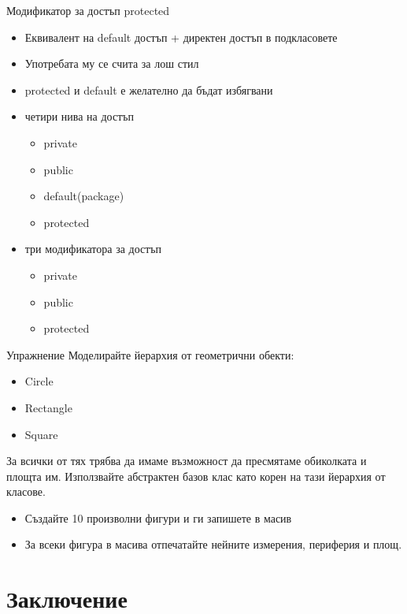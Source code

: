 \documentclass{beamer}
\begin{document}
\begin{frame}{Модификатор за достъп protected}
  \transdissolve
  \begin{itemize}
  \item Еквивалент на default достъп + директен достъп в подкласовете \pause
  \item Употребата му се счита за лош стил \pause
  \item protected и default е желателно да бъдат избягвани \pause
  \item четири нива на достъп
    \begin{itemize}
      \item private
      \item public
      \item default(package)
      \item protected
    \end{itemize}
  \item три модификатора за достъп \pause
    \begin{itemize}
      \item private
      \item public
      \item protected
    \end{itemize}
  \end{itemize}
\end{frame}

\begin{frame}{Упражнение}
  \transdissolve
  Моделирайте йерархия от геометрични обекти:
  \begin{itemize}
    \item Circle
    \item Rectangle
    \item Square
  \end{itemize}
  За всички от тях трябва да имаме възможност да пресмятаме обиколката и
  площта им. Използвайте абстрактен базов клас като корен на тази
  йерархия от класове.
  \begin{itemize}
    \item Създайте 10 произволни фигури и ги запишете в масив
    \item За всеки фигура в масива отпечатайте нейните измерения,
      периферия и площ.
  \end{itemize}

\end{frame}

\section*{Заключение}
\end{document}

